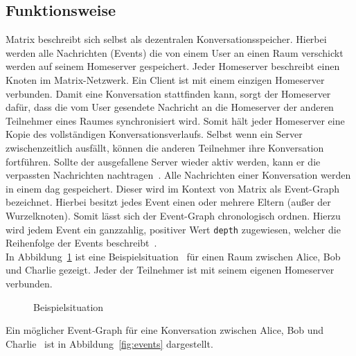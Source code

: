     \subsection{Funktionsweise}\label{subsec:funktionsweise}
    Matrix beschreibt sich selbst als dezentralen Konversationsspeicher\cite{matrix}.
    Hierbei werden alle Nachrichten (Events) die von einem User an einen Raum verschickt werden auf seinem Homeserver gespeichert.
    Jeder Homeserver beschreibt einen Knoten im Matrix-Netzwerk.
    Ein Client ist mit einem einzigen Homeserver verbunden.
    Damit eine Konversation stattfinden kann, sorgt der Homeserver dafür, dass die vom User gesendete Nachricht an die Homeserver der anderen Teilnehmer eines Raumes synchronisiert wird.
    Somit hält jeder Homeserver eine Kopie des vollständigen Konversationsverlaufs.
    Selbst wenn ein Server zwischenzeitlich ausfällt, können die anderen Teilnehmer ihre Konversation fortführen.
    Sollte der ausgefallene Server wieder aktiv werden, kann er die verpassten Nachrichten nachtragen~\cite{matrix}.
    Alle Nachrichten einer Konversation werden in einem \ac{dag} gespeichert.
    Dieser wird im Kontext von Matrix als Event-Graph bezeichnet.
    Hierbei besitzt jedes Event einen oder mehrere Eltern (außer der Wurzelknoten).
    Somit lässt sich der Event-Graph chronologisch ordnen.
    Hierzu wird jedem Event ein ganzzahlig, positiver Wert \texttt{depth} zugewiesen, welcher die Reihenfolge der Events beschreibt~\cite{eventgraph}.\\
    In Abbildung~\ref{fig:matrixfunktionsweise} ist eine Beispielsituation~\cite{matrix} für einen Raum zwischen Alice, Bob und Charlie gezeigt.
    Jeder der Teilnehmer ist mit seinem eigenen Homeserver verbunden.
    \begin{figure}[h]
        \centering
        
        \caption{Beispielsituation}
        \label{fig:matrixfunktionsweise}
    \end{figure}
    \newpage
    Ein möglicher Event-Graph für eine Konversation zwischen Alice, Bob und Charlie~\cite{matrix} ist in Abbildung~\ref{fig:events} dargestellt.
